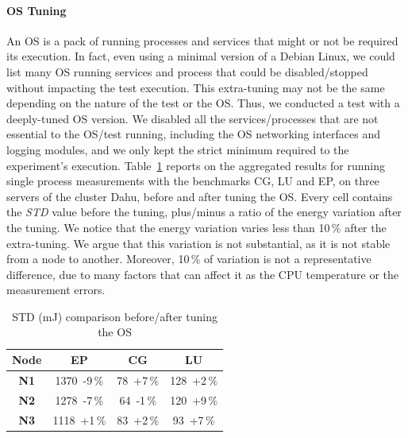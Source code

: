 \paragraph{OS Tuning}
An OS is a pack of running processes and services that might or not be required its execution.
In fact, even using a minimal version of a Debian Linux, we could list many OS running services and process that could be disabled/stopped without impacting the test execution.
This extra-tuning may not be the same depending on the nature of the test or the OS.
Thus, we conducted a test with a deeply-tuned OS version.
We disabled all the services/processes that are not essential to the OS/test running, including the OS networking interfaces and logging modules, and we only kept the strict minimum required to the experiment's execution.
Table~\ref{table:osmin} reports on the aggregated results for running single process measurements with the benchmarks \textsf{CG}, \textsf{LU} and \textsf{EP}, on three servers of the cluster \textsf{Dahu}, before and after tuning the OS.
Every cell contains the \emph{STD} value before the tuning, plus/minus a ratio of the energy variation after the tuning.
We notice that the energy variation varies less than 10\,\% after the extra-tuning.
We argue that this variation is not substantial, as it is not stable from a node to another.
Moreover, 10\,\% of variation is not a representative difference, due to many factors that can affect it as the CPU temperature or the measurement errors.

\begin{table}
    \centering
    \caption{STD (mJ) comparison before/after tuning the OS}
    \label{table:osmin}
    \small
    \begin{tabular}{|c|c|c|c|}
        \hline
        \textbf{Node} & \textbf{\sf EP} & \textbf{\sf CG} & \textbf{\sf LU} \\
        \hline
        \hline
        \textbf{N1}   & 1370~-9\,\%     & 78~+7\,\%       & 128~+2\,\%      \\
        \hline
        \textbf{N2}   & 1278~-7\,\%     & 64~-1\,\%       & 120~+9\,\%      \\
        \hline
        \textbf{N3}   & 1118~+1\,\%     & 83~+2\,\%       & 93~+7\,\%       \\
        \hline
    \end{tabular}
\end{table}

